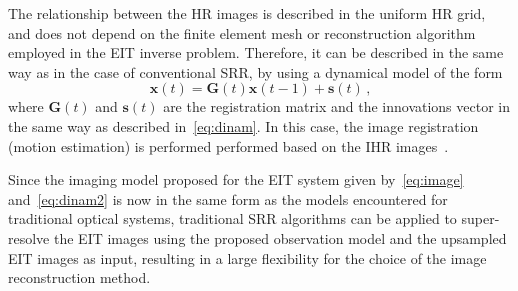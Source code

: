 \documentclass[10pt]{IEEEtran}
\newcommand{\cred}{}
\newcommand{\cblue}{}
\newcommand{\vs}{\mathbf{s}}
\newcommand{\vx}{\mathbf{x}}
\newcommand{\mG}{\mathbf{G}}
\begin{document}
The relationship between the HR images is described in the uniform HR grid, and does not depend on the finite element mesh or reconstruction algorithm employed in the EIT inverse problem. Therefore, it can be described in the same way as in the case of conventional SRR, by using \cred{a dynamical model of the form
\begin{equation} \label{eq:dinam2}
    \vx(t) = \mG(t) \vx(t-1) + \vs(t)
    \,\text{,}
\end{equation}
where $\mG(t)$ and $\vs(t)$ are the registration matrix \cblue{and the innovations vector} in the same way as described in~\eqref{eq:dinam}.}
In this case, the image registration (motion estimation) is performed performed based on the IHR images~\cite{Sun10}.


Since the imaging model proposed for the EIT system given by~\eqref{eq:image} and~\eqref{eq:dinam2} is now in the same form as the models encountered for traditional optical systems, traditional SRR algorithms can be applied to super-resolve the EIT images using the proposed observation model and the upsampled EIT images as input, resulting in a large flexibility for the choice of the image reconstruction method. 
\end{document}
